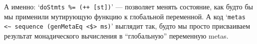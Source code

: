 А именно: `\lstinline{doStmts %= (++ [st])}' --- позволяет менять состояние, как будто бы мы применили мутирующую функцию к глобальной переменной. А код `\lstinline{metas <~ sequence (genMetaEq <$> ms)}' выглядит так, будто мы просто присваиваем результат монадического вычисления в ``глобальную'' переменную metas.











